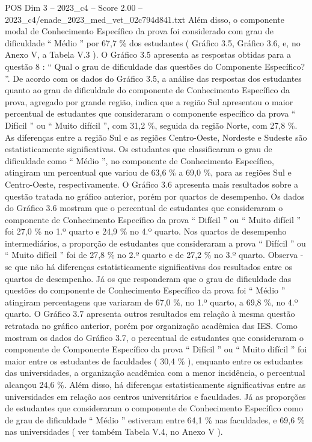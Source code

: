 \begin{textsample}{POS Dim 3 – 2023\_c4 – Score 2.00 – 2023\_c4/enade\_2023\_med\_vet\_02c794d841.txt}
Além disso, o componente modal de Conhecimento Específico da prova foi considerado com grau de dificuldade “ Médio ” por 67,7 \% dos estudantes ( Gráfico 3.5, Gráfico 3.6, e, no Anexo V, a Tabela V.3 ).
O Gráfico 3.5 apresenta as respostas obtidas para a questão 8 : “ Qual o grau de dificuldade das questões do Componente Específico? ”.
De acordo com os dados do Gráfico 3.5, a análise das respostas dos estudantes quanto ao grau de dificuldade do componente de Conhecimento Específico da prova, agregado por grande região, indica que a região Sul apresentou o maior percentual de estudantes que consideraram o componente específico da prova “ Difícil ” ou “ Muito difícil ”, com 31,2 \%, seguida da região Norte, com 27,8 \%.
As diferenças entre a região Sul e as regiões Centro-Oeste, Nordeste e Sudeste são estatisticamente significativas.
Os estudantes que classificaram o grau de dificuldade como “ Médio ”, no componente de Conhecimento Específico, atingiram um percentual que variou de 63,6 \% a 69,0 \%, para as regiões Sul e Centro-Oeste, respectivamente.
O Gráfico 3.6 apresenta mais resultados sobre a questão tratada no gráfico anterior, porém por quartos de desempenho.
Os dados do Gráfico 3.6 mostram que o percentual de estudantes que consideraram o componente de Conhecimento Específico da prova “ Difícil ” ou “ Muito difícil ” foi 27,0 \% no 1.º quarto e 24,9 \% no 4.º quarto.
Nos quartos de desempenho intermediários, a proporção de estudantes que consideraram a prova “ Difícil ” ou “ Muito difícil ” foi de 27,8 \% no 2.º quarto e de 27,2 \% no 3.º quarto.
Observa -se que não há diferenças estatisticamente significativas dos resultados entre os quartos de desempenho.
Já os que responderam que o grau de dificuldade das questões do componente de Conhecimento Específico da prova foi “ Médio ” atingiram percentagens que variaram de 67,0 \%, no 1.º quarto, a 69,8 \%, no 4.º quarto.
O Gráfico 3.7 apresenta outros resultados em relação à mesma questão retratada no gráfico anterior, porém por organização acadêmica das IES.
Como mostram os dados do Gráfico 3.7, o percentual de estudantes que consideraram o componente de Componente Específico da prova “ Difícil ” ou “ Muito difícil ” foi maior entre os estudantes de faculdades ( 30,4 \% ), enquanto entre os estudantes das universidades, a organização acadêmica com a menor incidência, o percentual alcançou 24,6 \%.
Além disso, há diferenças estatisticamente significativas entre as universidades em relação aos centros universitários e faculdades.
Já as proporções de estudantes que consideraram o componente de Conhecimento Específico como de grau de dificuldade “ Médio ” estiveram entre 64,1 \% nas faculdades, e 69,6 \% nas universidades ( ver também Tabela V.4, no Anexo V ).

\end{textsample}
